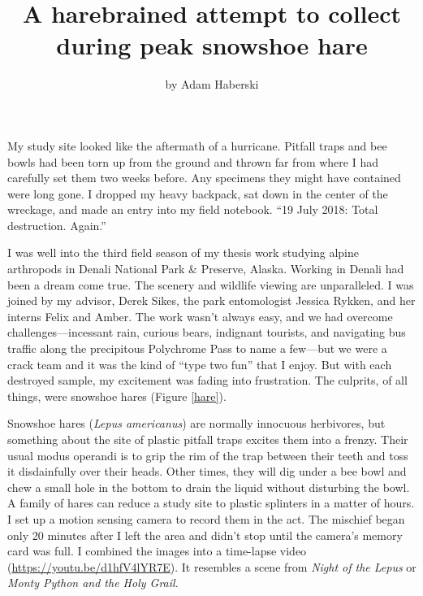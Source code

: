 \title{A harebrained attempt to collect during peak snowshoe hare}

\subtitle{}

\author{by Adam Haberski}

\maketitle

My study site looked like the aftermath of a hurricane. Pitfall traps and bee bowls had been torn up from the ground and thrown far from where I had carefully set them two weeks before. Any specimens they might have contained were long gone. I dropped my heavy backpack, sat down in the center of the wreckage, and made an entry into my field notebook. “19 July 2018: Total destruction. Again.”

I was well into the third field season of my thesis work studying alpine arthropods in Denali National Park \& Preserve, Alaska. Working in Denali had been a dream come true. The scenery and wildlife viewing are unparalleled. I was joined by my advisor, Derek Sikes, the park entomologist Jessica Rykken, and her interns Felix and Amber. The work wasn’t always easy, and we had overcome challenges---incessant rain, curious bears, indignant tourists, and navigating bus traffic along the precipitous Polychrome Pass to name a few---but we were a crack team and it was the kind of  “type two fun” that I enjoy. But with each destroyed sample, my excitement was fading into frustration. The culprits, of all things, were snowshoe hares (Figure \ref{hare}).

 

Snowshoe hares (\textit{Lepus americanus}) are normally innocuous herbivores, but something about the site of plastic pitfall traps excites them into a frenzy. Their usual modus operandi is to grip the rim of the trap between their teeth and toss it disdainfully over their heads. Other times, they will dig under a bee bowl and chew a small hole in the bottom to drain the liquid without disturbing the bowl. A family of hares can reduce a study site to plastic splinters in a matter of hours. I set up a motion sensing camera to record them in the act. The mischief began only 20 minutes after I left the area and didn’t stop until the camera’s memory card was full. I combined the images into a time-lapse video (\url{https://youtu.be/d1hfV4lYR7E}). It resembles a scene from \textit{Night of the Lepus} or \textit{Monty Python and the Holy Grail}.

